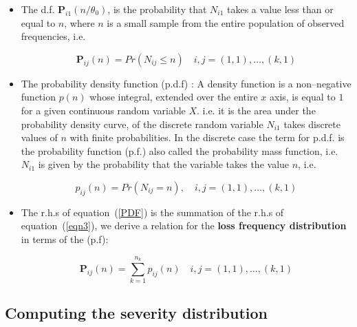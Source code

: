 \documentclass{DissertateUSU}
\begin{document}
\begin{itemize}
\item The d.f. \begin{math}\mathbf{P}_{i1}(n/\theta_0)  \end{math}, is the probability that $N_{i1}$ takes a value less than or equal to $n$, where $n$ is a small sample from the entire population of observed frequencies, i.e.

\singlespacing
\begin{equation}\label{PDF}
\mathbf{P}_{ij}(n)=Pr \left(N_{ij}\leq n \right) \quad{i,j}= (1,1),\ldots, (k,1)
\end{equation}
\doublespacing

\item The probability density function (p.d.f) : A density function is a non--negative function $p(n)$ whose integral, extended over the entire $x$ axis, is equal to $1$ for a given continuous random variable $X$. i.e. it is the area under the probability density curve, of the discrete random variable $N_{i1}$ takes discrete values of $n$ with finite probabilities. In the discrete case the term for p.d.f. is the probability function (p.f.) also called the probability mass function, i.e. $N_{i1}$ is given by the probability that the variable takes the value $n$, i.e.

\singlespacing
\begin{equation}\label{eqn3}
p_{ij}(n)=Pr\left(N_{ij} = n\right), \quad{i,j}= (1,1),\ldots, (k,1) 
\end{equation} 
\doublespacing

\item The r.h.s of equation~(\ref{PDF}) is the summation of the r.h.s of equation~(\ref{eqn3}), we derive a relation for the \textbf{loss frequency distribution} in terms of the (p.f): 

\singlespacing
\begin{equation}\label{eqn4} 
\mathbf{P}_{ij}(n)=\sum_{k=1}^{n_k} p_{ij}(n) \quad{i,j}= (1,1),\ldots, (k,1)
\end{equation}
\doublespacing

\end{itemize}

\subsection{Computing the severity distribution}
\end{document}
